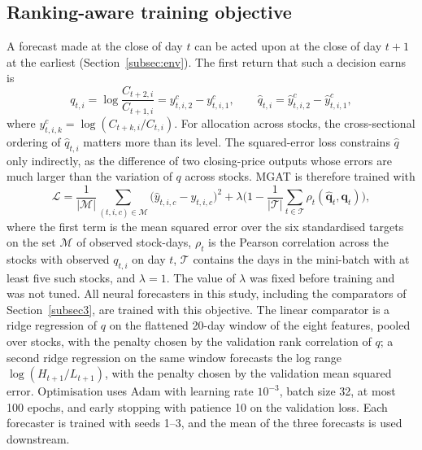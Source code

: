 \subsection{Ranking-aware training objective}\label{subsec:objective}
{\color{blue}A forecast made at the close of day $t$ can be acted upon at the close of day $t+1$ at the earliest (Section~\ref{subsec:env}). The first return that such a decision earns is
\begin{equation}
q_{t,i}=\log\frac{C_{t+2,i}}{C_{t+1,i}}=y^{c}_{t,i,2}-y^{c}_{t,i,1},\qquad \hat q_{t,i}=\hat y^{c}_{t,i,2}-\hat y^{c}_{t,i,1},
\label{eq:q}
\end{equation}
where $y^{c}_{t,i,k}=\log(C_{t+k,i}/C_{t,i})$. For allocation across stocks, the cross-sectional ordering of $\hat q_{t,i}$ matters more than its level. The squared-error loss constrains $\hat q$ only indirectly, as the difference of two closing-price outputs whose errors are much larger than the variation of $q$ across stocks. MGAT is therefore trained with
\begin{equation}
\mathcal{L}=\frac{1}{|\mathcal{M}|}\sum_{(t,i,c)\in\mathcal{M}}\big(\hat y_{t,i,c}-y_{t,i,c}\big)^2+\lambda\Big(1-\frac{1}{|\mathcal{T}|}\sum_{t\in\mathcal{T}}\rho_t(\hat{\mathbf{q}}_t,\mathbf{q}_t)\Big),
\label{eq:loss}
\end{equation}
where the first term is the mean squared error over the six standardised targets on the set $\mathcal{M}$ of observed stock-days, $\rho_t$ is the Pearson correlation across the stocks with observed $q_{t,i}$ on day $t$, $\mathcal{T}$ contains the days in the mini-batch with at least five such stocks, and $\lambda=1$. The value of $\lambda$ was fixed before training and was not tuned. All neural forecasters in this study, including the comparators of Section~\ref{subsec3}, are trained with this objective. The linear comparator is a ridge regression of $q$ on the flattened 20-day window of the eight features, pooled over stocks, with the penalty chosen by the validation rank correlation of $q$; a second ridge regression on the same window forecasts the log range $\log(H_{t+1}/L_{t+1})$, with the penalty chosen by the validation mean squared error. Optimisation uses Adam with learning rate $10^{-3}$, batch size 32, at most 100 epochs, and early stopping with patience 10 on the validation loss. Each forecaster is trained with seeds 1--3, and the mean of the three forecasts is used downstream.\par}

